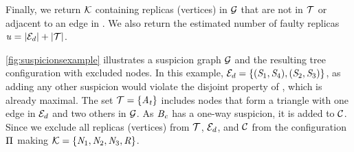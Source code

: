 Finally, we return $\mathcal{K}$ containing replicas (vertices) in $\mathcal{G}$ that are not in $\mathcal{T}$ or adjacent to an edge in \MG.
We also return the estimated number of faulty replicas $\mathit{u}=|\mathcal{E}_d|+|\mathcal{T}|$.



\cref{fig:suspicionsexample} illustrates a suspicion graph $\mathcal{G}$ and the resulting tree configuration with excluded nodes.
In this example, $\mathcal{E}_d = \{(\mathit{S}_{1},\mathit{S}_{4}), (\mathit{S}_{2},\mathit{S}_{3})\}$, as adding any other suspicion would violate the disjoint property of \MG, which is already maximal.
The set $\mathcal{T} = \{\mathit{A_t}\}$ includes nodes that form a triangle with one edge in $\mathcal{E}_d$ and two others in $\mathcal{G}$.
As $\mathit{B_c}$ has a one-way suspicion, it is added to $\mathcal{C}$.
Since we exclude all replicas (vertices) from $\mathcal{T}$, $\mathcal{E}_d$, and $\mathcal{C}$ from the configuration $\Pi_{}$ making $\mathcal{K} = \{\mathit{N}_{1},\mathit{N}_{2},\mathit{N}_{3},\mathit{R}\}$.
